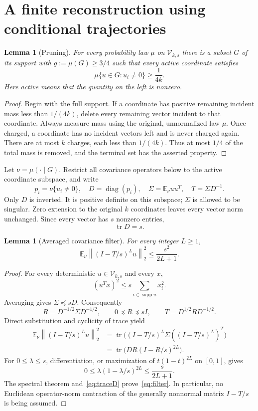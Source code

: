 \documentclass[11pt,a4paper]{article}
\newtheorem{lemma}[theorem]{Lemma}
\theoremstyle{remark}\newtheorem{remark}[theorem]{Remark}
\newcommand{\E}{\mathbb E}
\newcommand{\supp}{\operatorname{supp}}
\newcommand{\tr}{\operatorname{tr}}
\newcommand{\diag}{\operatorname{diag}}
\newcommand{\norm}[1]{\left\lVert #1\right\rVert}
\begin{document}
\section{A finite reconstruction using conditional trajectories}
\begin{lemma}[Pruning]\label{lem:prune}
For every probability law $\mu$ on $\mathcal V_{k,s}$ there is a subset $G$ of its support with $g:=\mu(G)\ge3/4$ such that every active coordinate satisfies
\begin{equation}\label{eq:rawincidence}
 \mu\{u\in G:u_i\ne0\}\ge\frac1{4k}.
\end{equation}
Here active means that the quantity on the left is nonzero.
\end{lemma}
\begin{proof}
Begin with the full support. If a coordinate has positive remaining incident mass less than $1/(4k)$, delete every remaining vector incident to that coordinate. Always measure mass using the original, unnormalized law $\mu$. Once charged, a coordinate has no incident vectors left and is never charged again. There are at most $k$ charges, each less than $1/(4k)$. Thus at most $1/4$ of the total mass is removed, and the terminal set has the asserted property.
\end{proof}

Let $\nu=\mu(\cdot\mid G)$. Restrict all covariance operators below to the active coordinate subspace, and write
\[
 p_i=\nu\{u_i\ne0\},\quad D=\diag(p_i),\quad
 \Sigma=\E_\nu uu^T,\quad T=\Sigma D^{-1}.
\]
Only $D$ is inverted. It is positive definite on this subspace; $\Sigma$ is allowed to be singular. Zero extension to the original $k$ coordinates leaves every vector norm unchanged. Since every vector has $s$ nonzero entries,
\begin{equation}\label{eq:traceD}
 \tr D=s.
\end{equation}

\begin{lemma}[Averaged covariance filter]\label{lem:filter}
For every integer $L\ge1$,
\begin{equation}\label{eq:filter}
 \E_\nu\norm{(I-T/s)^Lu}_2^2\le\frac{s^2}{2L+1}.
\end{equation}
\end{lemma}
\begin{proof}
For every deterministic $u\in\mathcal V_{k,s}$ and every $x$,
\[
 (u^Tx)^2\le s\sum_{i\in\supp u}x_i^2.
\]
Averaging gives $\Sigma\preceq sD$. Consequently
\[
 R=D^{-1/2}\Sigma D^{-1/2},\qquad 0\preceq R\preceq sI,
 \qquad T=D^{1/2}RD^{-1/2}.
\]
Direct substitution and cyclicity of trace yield
\begin{align*}
 \E_\nu\norm{(I-T/s)^Lu}_2^2
 &=\tr\big((I-T/s)^L\Sigma((I-T/s)^L)^T\big)\\
 &=\tr\big(DR(I-R/s)^{2L}\big).
\end{align*}
For $0\le\lambda\le s$, differentiation, or maximization of $t(1-t)^{2L}$ on $[0,1]$, gives
\[
 0\le\lambda(1-\lambda/s)^{2L}
 \le \frac{s}{2L+1}.
\]
The spectral theorem and~\eqref{eq:traceD} prove~\eqref{eq:filter}. In particular, no Euclidean operator-norm contraction of the generally nonnormal matrix $I-T/s$ is being assumed.
\end{proof}
\end{document}
